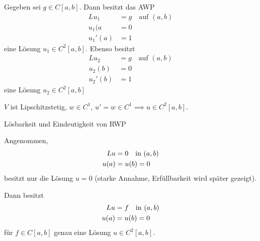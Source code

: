 \begin{folgerung}\label{fol:2-2}
  Gegeben sei $g \in C[a, b]$. Dann besitzt das AWP
  \begin{align*}
    L u_{1} &= g \quad \text{auf } (a, b)\\
    u_{1}(a &=0\\
    u_{1}'(a) &=1
  \end{align*}
eine Lösung $u_{1} \in C^{2}[a, b]$. Ebenso besitzt 
  \begin{align*}
    L u_{2} &= g \quad \text{auf } (a, b)\\
    u_{2}(b) &=0\\
    u_{2}'(b) &=1
  \end{align*}
eine Lösung $u_{2} \in C^{2}[a, b]$
\end{folgerung}
\begin{beweis}
  $V$ ist Lipschitzstetig, $w \in C^{1}$, $u' = w \in C^{1} \implies u \in C^{2}[a, b]$. 
\end{beweis}
\begin{satz}Lösbarkeit und Eindeutigkeit von RWP

Angenommen,
\begin{align}\label{eq:2-3}
    L u &= 0 \quad \text{in } (a, b)\\
    u(a) &= u(b) =0 \notag
\end{align}
besitzt nur die Lösung $u = 0$ (starke Annahme, Erfüllbarkeit wird später gezeigt).   

Dann besitzt
\begin{align}\label{eq:2-4}
  L u &= f \quad \text{in } (a, b)\\
  u(a) &= u(b) =0 \notag
\end{align}
für $f \in C[a, b]$ genau eine Lösung $u \in C^{2}[a, b]$. 
\end{satz}
